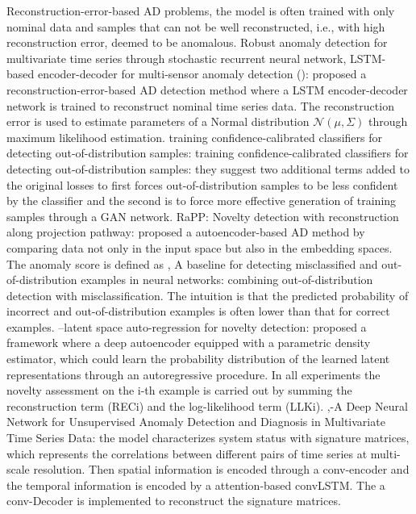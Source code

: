 \documentclass{article}
\begin{document}
	
	Reconstruction-error-based AD problems, the model is often trained with only nominal data and samples that can not be well reconstructed, i.e., with high reconstruction error, deemed to be anomalous.
	\cite{su2019robust} Robust anomaly detection for multivariate time series through stochastic recurrent neural network,
	\cite{malhotra2016lstm} LSTM-based encoder-decoder for multi-sensor anomaly detection (): proposed a reconstruction-error-based AD detection method where a LSTM encoder-decoder network is trained to reconstruct nominal time series data. The reconstruction error is used to estimate parameters of a Normal distribution $\mathcal{N}(\mu, \Sigma)$ through maximum likelihood estimation. 
	\cite{lee2017training} training confidence-calibrated classifiers for detecting out-of-distribution samples: training confidence-calibrated classifiers for detecting out-of-distribution samples: they suggest two additional terms added to the original losses to first forces out-of-distribution samples to be less confident by the classifier and the second is to force more effective generation of training samples through a GAN network.
	\cite{kim2019rapp} RaPP: Novelty detection with reconstruction along projection pathway: proposed a autoencoder-based AD method by comparing data not only in the input space but also in the embedding spaces. The anomaly score is defined as ,
	\cite{hendrycks2016baseline} A baseline for detecting misclassified and out-of-distribution examples in neural networks: combining out-of-distribution detection with misclassification. The intuition is that the predicted probability of incorrect and out-of-distribution examples is often lower than that for correct examples.
	\cite{abati2019latent}--latent space auto-regression for novelty detection: proposed a framework where a deep autoencoder equipped with a parametric density estimator, which could learn the probability distribution of the learned latent representations through an autoregressive procedure. In all experiments the novelty assessment on the i-th example is carried out by summing the reconstruction term (RECi) and the log-likelihood term (LLKi).
	\cite{zhang2019deep},-A Deep Neural Network for Unsupervised Anomaly Detection and Diagnosis in Multivariate Time Series Data: the model characterizes system status with signature matrices, which represents the correlations between different pairs of time series at multi-scale resolution. Then spatial information is encoded through a conv-encoder and the temporal information is encoded by a attention-based convLSTM. The a conv-Decoder is implemented to reconstruct the signature matrices.
\end{document}
